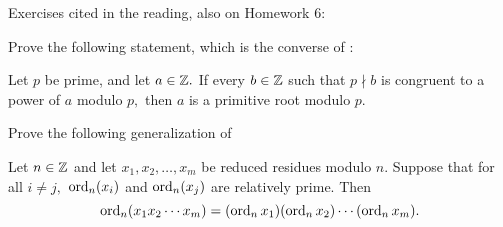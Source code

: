 \documentclass{ximera}
\begin{document}
Exercises cited in the reading, also on Homework 6:



\begin{br}
    Prove the following statement, which is the converse of :

    Let $p$ be prime, and let $a\in\mathbb Z.$ If every $b\in\mathbb Z$ such that $p\nmid b$ is congruent to a power of $a$ modulo $p,$ then ${a}$ is a primitive root modulo $p$.
    
\end{br}

\begin{br}
    Prove the following generalization of 
    
    
    \begin{lemma}
        Let $n\in\mathbb Z$ and let $x_1,x_2,\dots,x_m$ be reduced residues modulo $n$.  Suppose that for all $i\neq j,$ $\operatorname{ord}_n(x_i)$ and $\operatorname{ord}_n(x_j)$ are relatively prime. Then \[\operatorname{ord}_n(x_1 x_2\cdots x_m)=(\operatorname{ord}_n x_1)(\operatorname{ord}_n x_2)\cdots (\operatorname{ord}_n x_m).\]
    \end{lemma}
\end{br}
\end{document}
